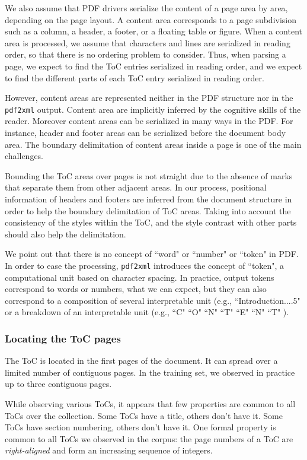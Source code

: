 We also assume that PDF drivers serialize the content of a page area by area, depending on the page layout. A content area corresponds to a page subdivision such as a column, a header, a footer, or a floating table or figure. When a content area is processed, we assume that characters and lines are serialized in reading order, so that there is no ordering problem to consider. Thus, when parsing a page, we expect to find the ToC entries serialized in reading order, and we expect to find the different parts of each ToC entry serialized in reading order.

However, content areas are represented neither in the PDF structure nor in the \texttt{pdf2xml} output. Content area are implicitly inferred by the cognitive skills of the reader. Moreover content areas can be serialized in many ways in the PDF. For instance, header and footer areas can be serialized before the document body area. The boundary delimitation of content areas inside a page is one of the main challenges. 

Bounding the ToC areas over pages is not straight due to the absence of marks that separate them from other adjacent areas. In our process, positional information of headers and footers are inferred from the document structure in order to help the boundary delimitation of ToC areas. Taking into account the consistency of the styles within the ToC, and the style contrast with other parts should also help the delimitation.

We point out that there is no concept of ``word" or ``number" or ``token" in PDF. In order to ease the processing, \texttt{pdf2xml} introduces the concept of ``token", a computational unit based on character spacing. In practice, output tokens correspond to words or numbers, what we can expect, but they can also correspond to a composition of several interpretable unit (e.g., ``Introduction....5" or a breakdown of an interpretable unit (e.g., ``C" ``O" ``N" ``T" ``E" ``N" ``T" ).

\subsubsection{Locating the ToC pages}

The ToC is located in the first pages of the document. It can spread over a limited number of contiguous pages. In the training set, we observed in practice up to three contiguous pages. 

While observing various ToCs, it appears that few properties are common to all ToCs over the collection. Some ToCs have a title, others don't have it. Some ToCs have section numbering, others don't have it. One formal property is common to all ToCs we observed in the corpus: the page numbers of a ToC are \emph{right-aligned} and form an increasing sequence of integers.

